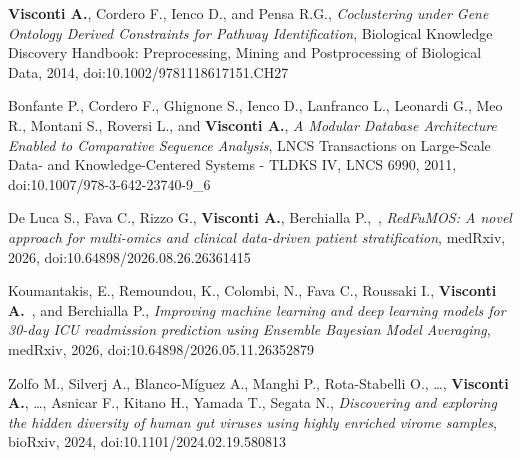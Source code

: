 \medskip


	\begin{itemize}
		
		 \textbf{Visconti A.}, Cordero F., Ienco D., and Pensa R.G., \emph{Coclustering under Gene Ontology Derived Constraints for Pathway Identification}, Biological Knowledge Discovery Handbook: Preprocessing, Mining and Postprocessing of Biological Data, 2014,  doi:10.1002/9781118617151.CH27 %
		
	   Bonfante P., Cordero F., Ghignone S., Ienco D., Lanfranco L., Leonardi G., Meo R., Montani S., Roversi L., and \textbf{Visconti A.}, \emph{A Modular Database Architecture Enabled to Comparative Sequence Analysis}, LNCS Transactions on Large-Scale Data- and Knowledge-Centered Systems - TLDKS IV, LNCS 6990, 2011, doi:10.1007/978-3-642-23740-9\_6 %
		
		
	\end{itemize}
	

\medskip


	\begin{itemize}
		
		 De Luca S., Fava C., Rizzo G., \textbf{Visconti A.}\colast, Berchialla P.,\colast ~\corresponding, \emph{RedFuMOS: A novel approach for multi-omics and clinical data-driven patient stratification}, medRxiv, 2026, doi:10.64898/2026.08.26.26361415

		  Koumantakis, E., Remoundou, K., Colombi, N., Fava C., Roussaki I., \textbf{Visconti A.}\colast ~\corresponding, and Berchialla P.\colast, \emph{Improving machine learning and deep learning models for 30-day ICU readmission prediction using Ensemble Bayesian Model Averaging}, medRxiv, 2026, doi:10.64898/2026.05.11.26352879  %

		 Zolfo M., Silverj A., Blanco-Míguez A., Manghi P., Rota-Stabelli O., \dots, \textbf{Visconti A.}, \dots, Asnicar F., Kitano H., Yamada T., Segata N.\corresponding, \emph{Discovering and exploring the hidden diversity of human gut viruses using highly enriched virome samples}, bioRxiv, 2024, doi:10.1101/2024.02.19.580813  %

	\end{itemize}

\medskip

